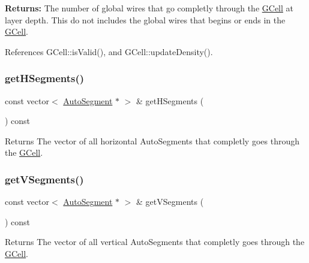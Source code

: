 {\bfseries Returns\+:} The number of global wires that go completly through the \mbox{\hyperlink{classKatabatic_1_1GCell}{G\+Cell}} at layer {\ttfamily depth}. This do not includes the global wires that begins or ends in the \mbox{\hyperlink{classKatabatic_1_1GCell}{G\+Cell}}. 

References G\+Cell\+::is\+Valid(), and G\+Cell\+::update\+Density().

\mbox{\label{classKatabatic_1_1GCell_a81575302a8794958c310dc101807e9c5}} 
\subsubsection{\texorpdfstring{get\+H\+Segments()}{getHSegments()}}
{\footnotesize\ttfamily const vector$<$ \mbox{\hyperlink{classKatabatic_1_1AutoSegment}{Auto\+Segment}} $\ast$ $>$ \& get\+H\+Segments (\begin{DoxyParamCaption}{ }\end{DoxyParamCaption}) const\hspace{0.3cm}{\ttfamily [inline]}}

\begin{DoxyReturn}{Returns}
The vector of all horizontal Auto\+Segments that completly goes through the \mbox{\hyperlink{classKatabatic_1_1GCell}{G\+Cell}}. 
\end{DoxyReturn}
\mbox{\label{classKatabatic_1_1GCell_ac3c357d72a24990494758dcc216e3b1e}} 
\subsubsection{\texorpdfstring{get\+V\+Segments()}{getVSegments()}}
{\footnotesize\ttfamily const vector$<$ \mbox{\hyperlink{classKatabatic_1_1AutoSegment}{Auto\+Segment}} $\ast$ $>$ \& get\+V\+Segments (\begin{DoxyParamCaption}{ }\end{DoxyParamCaption}) const\hspace{0.3cm}{\ttfamily [inline]}}

\begin{DoxyReturn}{Returns}
The vector of all vertical Auto\+Segments that completly goes through the \mbox{\hyperlink{classKatabatic_1_1GCell}{G\+Cell}}. 
\end{DoxyReturn}
\mbox{\label{classKatabatic_1_1GCell_aacf50ce6dcef3a7523453725af7feeae}} 

